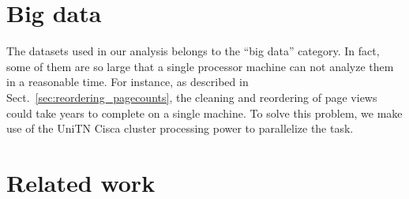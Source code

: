 

\section{Big data}
\label{sec:bigdata}


The datasets used in our analysis belongs to the ``big data'' category.
In fact, some of them are so large that a single processor machine can not analyze them in a reasonable time.
For instance, as described in Sect.~\ref{sec:reordering_pagecounts}, the cleaning and reordering of page views could take years  to complete on a single machine.
To solve this problem, we make use of the UniTN Cisca cluster processing power to parallelize the task.


\section{Related work}
\label{sec:relatedwork}
